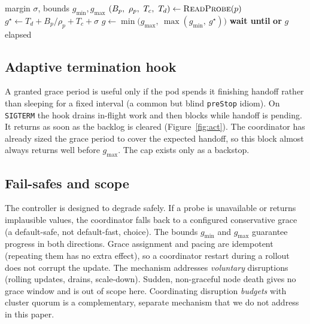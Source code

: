 \documentclass[AMA,Times1COL]{WileyNJDv5}
\begin{document}
\begin{algorithm}[t]
\caption{Adaptive grace computation and rollout pacing (coordinator side).}\label{alg:grace}
\begin{algorithmic}[1]
\Require margin $\sigma$, bounds $g_{\min}, g_{\max}$
  \State $(B_p,\ \rho_p,\ T_c,\ T_d) \gets \Call{ReadProbe}{p}$
  \State $g^\star \gets T_d + B_p/\rho_p + T_c + \sigma$ 
  \State $g \gets \min\big(g_{\max},\ \max(g_{\min},\ g^\star)\big)$ 
  \State {}
  \State {} 
  \State \textbf{wait until}  \textbf{or} $g$ elapsed
  \State {} 
\EndProcedure
\end{algorithmic}
\end{algorithm}



\subsection{Adaptive termination hook}\label{sec:design-hook}

A granted grace period is useful only if the pod spends it finishing handoff rather than sleeping for
a fixed interval (a common but blind \texttt{preStop} idiom). On \texttt{SIGTERM} the hook drains
in-flight work and then blocks while handoff is pending. It returns as soon as the backlog is cleared
(Figure~\ref{fig:act}). The coordinator has already sized the grace period to cover the
expected handoff, so this block almost always returns well before $g_{\max}$. The cap exists only as a
backstop.

\subsection{Fail-safes and scope}\label{sec:design-failsafe}

The controller is designed to degrade safely. If a probe is unavailable or returns implausible values,
the coordinator falls back to a configured conservative grace (a default-safe, not default-fast,
choice). The bounds $g_{\min}$ and $g_{\max}$ guarantee progress in both directions. Grace assignment
and pacing are idempotent (repeating them has no extra effect), so a coordinator restart during a
rollout does not corrupt the update. The mechanism addresses \emph{voluntary} disruptions (rolling
updates, drains, scale-down). Sudden, non-graceful node death gives no grace window and is out of scope
here. Coordinating disruption \emph{budgets} with cluster quorum is a complementary, separate mechanism
that we do not address in this paper.
\end{document}
